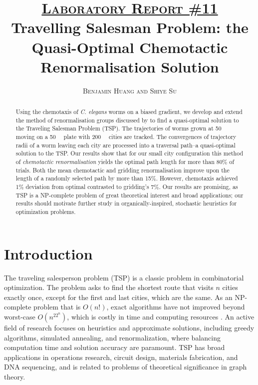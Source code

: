\documentclass[10pt]{article}
\title{\vspace{-2cm} \textsc{\underline{Laboratory Report \#11}} \\ \textbf{Travelling Salesman Problem: the Quasi-Optimal Chemotactic Renormalisation Solution} \vspace{-0.5cm}}
\author{\textsc{Benjamin Huang and Shiye Su}}
\date{}
\begin{document}
\maketitle

\begin{abstract}

Using the chemotaxis of \textit{C. elegans} worms on a biased  gradient, we develop and extend the method of renormalisation groups discussed by \citet{Yoshiyuki1995} to find a quasi-optimal solution to the Traveling Salesman Problem (TSP). The trajectories of worms grown at \SI{50}{\milli\molar}  moving on a \SI{50}{\milli\molar} plate with \SI{200}{\milli\molar} cities are tracked. The convergences of trajectory radii of a worm leaving each city are processed into a traversal path--a quasi-optimal solution to the TSP. Our results show that for our small city configuration this method of \emph{chemotactic renormalisation} yields the optimal path length for more than 80\% of trials. Both the mean chemotactic and gridding renormalisation improve upon the length of a randomly selected path by more than 15\%. However, chemotaxis achieved 1\% deviation from optimal contrasted to gridding's 7\%. Our results are promising, as TSP is a NP-complete problem of great theoretical interest and broad applications; our results should motivate further study in organically-inspired, stochastic heuristics for optimization problems.

\end{abstract}

\section{Introduction}

The traveling salesperson problem (TSP) is a classic problem in combinatorial optimization. The problem asks to find the shortest route that visits $n$ cities exactly once, except for the first and last cities, which are the same. As an NP-complete problem that is $O(n!)$, exact algorithms have not improved beyond worst-case $O(n^22^n)$, which is costly in time and computing resources \citep{Held1962}. An active field of research focuses on heuristics and approximate solutions, including greedy algorithms, simulated annealing, and renormalization, where balancing computation time and solution accuracy are paramount. TSP has broad applications in operations research, circuit design, materials fabrication, and DNA sequencing, and is related to problems of theoretical significance in graph theory.
\end{document}
